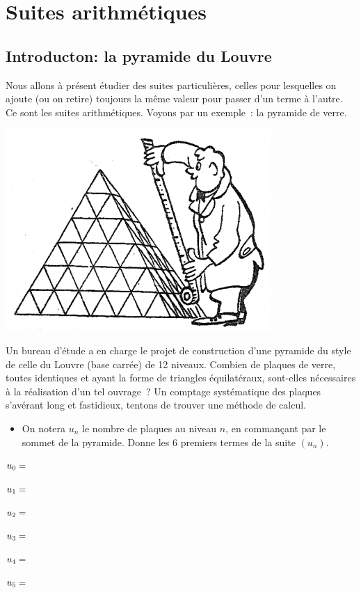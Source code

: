 \documentclass[a4paper,12pt]{report}
\begin{document}
\chapter{Suites arithmétiques}
\label{sec:org2712730}

\section{Introducton: la pyramide du Louvre}
\label{sec:org2c5d23d}

Nous allons à présent étudier des suites particulières, celles pour lesquelles on ajoute (ou on retire) toujours la même valeur pour passer d’un terme à l’autre. Ce sont les suites arithmétiques.
Voyons par un exemple : la pyramide de verre.
\begin{center}
\includegraphics[scale=0.5]{figures/pyramide.png}
\end{center}
Un bureau d’étude a en charge le projet de construction d’une pyramide du style de celle du Louvre (base carrée) de 12 niveaux.
Combien de plaques de verre, toutes identiques et ayant la forme de triangles équilatéraux, sont-elles nécessaires à la réalisation d’un tel ouvrage ?
Un comptage systématique des plaques s’avérant long et fastidieux,
tentons de trouver une méthode de calcul.

\begin{itemize}
\item On notera \(u_{n}\) le nombre de plaques au niveau \(n\), en commançant par le sommet de la pyramide.
Donne les \(6\) premiers termes de la suite \((u_{n})\).
\end{itemize}
\par \setlength{\columnseprule}{0 pt}
          \begin{minipage}[t]{\linewidth}
          \begin{multicols}{3}
\(u_{0}=\dotfill\)

\(u_{1}=\dotfill\)

\(u_{2}=\dotfill\)

\(u_{3}=\dotfill\)

\(u_{4}=\dotfill\)

\(u_{5}=\dotfill\)


\end{multicols}\end{minipage}
\end{document}
